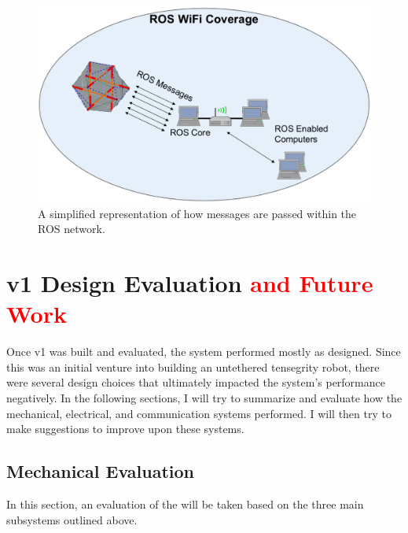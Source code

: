 \begin{figure}[thpb]%
      \centering
      \includegraphics[width=0.8\columnwidth]{tex/img/ROS_Wireless}
      \caption{A simplified representation of how messages are passed within the \SB{} ROS network.}
      \label{fig:ros_diagram}
\end{figure}

\section{\SB{} v1 Design Evaluation \textcolor{red}{and Future Work}}
Once \SB{} v1 was built and evaluated, the system performed mostly as designed.
Since this was an initial venture into building an untethered tensegrity robot, there were several design choices that ultimately impacted the system's performance negatively.
In the following sections, I will try to summarize and evaluate how the mechanical, electrical, and communication systems performed.
I will then try to make suggestions to improve upon these systems.

\subsection{Mechanical Evaluation}

In this section, an evaluation of the \SB{} will be taken based on the three main subsystems outlined above.

